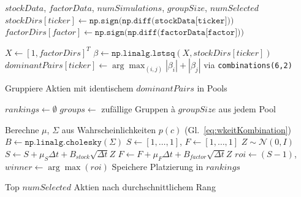 \small
\begin{algorithm}[H]
    \caption{SDE-Selector Implementierung}\label{alg:SDE_Selector}
    \begin{algorithmic}[1]
        \Require $stockData$, $factorData$, $numSimulations$, $groupSize$, $numSelected$
        \State {}
        \State $stockDirs[ticker] \gets \texttt{np.sign(np.diff(stockData[ticker]))}$
        \EndFor
        \State $factorDirs[factor] \gets \texttt{np.sign(np.diff(factorData[factor]))}$
        \EndFor

        \State {}
        \State $X \gets [1, factorDirs]^T$ 
        \State $\beta \gets \texttt{np.linalg.lstsq}(X, stockDirs[ticker])$
        \State $dominantPairs[ticker] \gets \arg\max_{(i,j)} |\beta_i| + |\beta_j|$ via \texttt{combinations(6,2)}
        \EndFor

        \State {}
        \State Gruppiere Aktien mit identischem $dominantPairs$ in Pools

        \State $rankings \gets \emptyset$
        \State {}
        \State $groups \gets$ zufällige Gruppen à $groupSize$ aus jedem Pool

         
        \State Berechne $\mu$, $\Sigma$ aus Wahrscheinlichkeiten $p(c)$ (Gl.~\ref{eq:wkeitKombination})
        \State $B \gets \texttt{np.linalg.cholesky}(\Sigma)$
        \State $S \gets [1, \ldots, 1]$, $F \gets [1, \ldots, 1]$
        \State $Z \sim \mathcal{N}(0, I)$
        \State $S \gets S + \mu_S \Delta t + B_{stock} \sqrt{\Delta t} Z$
        \State $F \gets F + \mu_F \Delta t + B_{factor} \sqrt{\Delta t} Z$
        \EndFor
        \State $roi \gets (S - 1)$, $winner \gets \arg\max(roi)$
        \State Speichere Platzierung in $rankings$
        \EndFor
        \EndFor

        \State {}
        \State \Return Top $numSelected$ Aktien nach durchschnittlichem Rang
    \end{algorithmic}
\end{algorithm}

